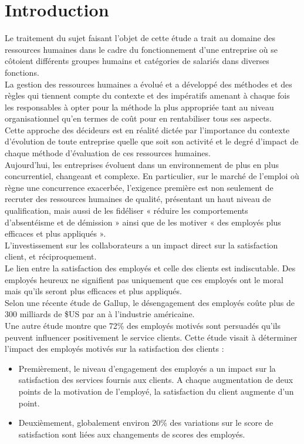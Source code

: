 \chapter*{Introduction}

Le traitement du sujet faisant l'objet de cette étude a trait au domaine des ressources humaines dans le cadre du fonctionnement d'une entreprise où se côtoient différents groupes humains  et catégories de salariés dans diverses fonctions.\\
La gestion des ressources humaines a évolué et a développé des méthodes et des règles qui tiennent compte du contexte et des impératifs amenant à chaque fois les responsables à opter pour la méthode la plus appropriée tant au niveau organisationnel qu'en termes de coût pour en rentabiliser tous ses aspects.\\
Cette approche des décideurs est en réalité dictée par l'importance du contexte d'évolution de toute entreprise quelle que soit son activité et le degré d'impact de  chaque méthode d'évaluation de ces ressources humaines.\\

 
Aujourd'hui, les entreprises évoluent dans un environnement de plus en plus concurrentiel, changeant et complexe. En particulier, sur le marché de l'emploi où règne une concurrence exacerbée, l'exigence première est non seulement de recruter des ressources humaines de qualité, présentant un haut niveau de qualification, mais aussi de les fidéliser « réduire les comportements d'absentéisme et de démission » ainsi que de les motiver « des employés plus efficaces et plus appliqués ».\\
L'investissement sur les collaborateurs a un impact direct sur la satisfaction client, et réciproquement.\\
Le lien entre la satisfaction des employés et celle des clients est indiscutable. Des employés heureux ne signifient pas uniquement que ces employés ont le moral mais qu'ils seront plus efficaces et plus appliqués.\\ 
Selon une récente étude de Gallup, le désengagement des employés coûte plus de 300 milliards de \$US par an à l'industrie américaine. \\
Une autre étude montre que 72\% des employés motivés sont persuadés qu'ils peuvent influencer positivement le service clients. Cette étude visait à déterminer l'impact des employés motivés sur la satisfaction des clients :
\begin{itemize}
\item	Premièrement, le niveau d'engagement des employés a un impact sur la satisfaction des services fournis aux clients. A chaque augmentation de deux points de la motivation de l'employé, la satisfaction du client augmente d'un point.
\item	Deuxièmement, globalement environ 20\% des variations sur le score de satisfaction sont liées aux changements de scores des employés.\\
\end{itemize}

